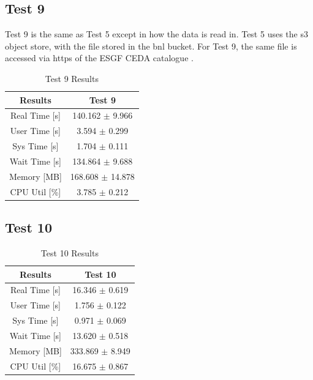 \documentclass{article}
\begin{document}

\subsection{Test 9}
Test 9 is the same as Test 5 except in how the data is read in. Test 5 uses the s3 object store, with the file stored in the bnl bucket. For Test 9, the same file is accessed via https of the ESGF CEDA catalogue . 

\begin{table}[h!]
    \centering
    \begin{tabular}{cc}
        \hline
        \textbf{Results} & Test 9                \\ \hline
        Real Time [s]    &  140.162 $\pm$ 9.966  \\
        User Time [s]    &  3.594   $\pm$ 0.299  \\
        Sys Time [s]     &  1.704   $\pm$ 0.111  \\
        Wait Time [s]    &  134.864 $\pm$ 9.688  \\
        Memory [MB]      &  168.608 $\pm$ 14.878 \\
        CPU Util [\%]    &  3.785   $\pm$ 0.212  \\
        \hline
    \end{tabular}
    \caption{Test 9 Results}
    \label{tab:T9_Results}
\end{table}



\subsection{Test 10}

\begin{table}[h!]
    \centering
    \begin{tabular}{cc}
        \hline
        \textbf{Results} & Test 10                \\ \hline
        Real Time [s]    &  16.346  $\pm$ 0.619  \\
        User Time [s]    &  1.756   $\pm$ 0.122  \\
        Sys Time [s]     &  0.971   $\pm$ 0.069  \\
        Wait Time [s]    &  13.620  $\pm$ 0.518  \\
        Memory [MB]      &  333.869 $\pm$ 8.949 \\
        CPU Util [\%]    &  16.675  $\pm$ 0.867  \\
        \hline
    \end{tabular}
    \caption{Test 10 Results}
    \label{tab:T10_Results}
\end{table}
 
\end{document}

